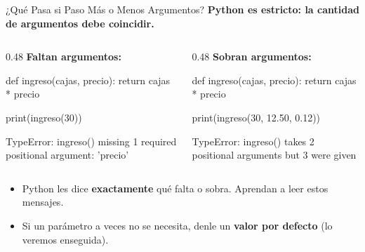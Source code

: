 \documentclass[aspectratio=169, 11pt]{beamer}
\begin{document}
\begin{frame}[fragile,shrink=28]{¿Qué Pasa si Paso Más o Menos Argumentos?}
  \vspace{-6pt}
  {\footnotesize\color{arcaDark}\bfseries
    Python es estricto: la cantidad de argumentos debe coincidir.}

  \vspace{4pt}
  \begin{columns}[T]
    \begin{column}{0.48\textwidth}
      {\scriptsize\color{arcaRed}\bfseries\faTimesCircle\hspace{4pt}
        Faltan argumentos:}
      \begin{pyblock}
def ingreso(cajas, precio):
    return cajas * precio

print(ingreso(30))
      \end{pyblock}
      \vspace{-2pt}
      \begin{outputblock}
TypeError: ingreso() missing 1 required
  positional argument: 'precio'
      \end{outputblock}
    \end{column}

    \begin{column}{0.48\textwidth}
      {\scriptsize\color{arcaRed}\bfseries\faTimesCircle\hspace{4pt}
        Sobran argumentos:}
      \begin{pyblock}
def ingreso(cajas, precio):
    return cajas * precio

print(ingreso(30, 12.50, 0.12))
      \end{pyblock}
      \vspace{-2pt}
      \begin{outputblock}
TypeError: ingreso() takes 2 positional
  arguments but 3 were given
      \end{outputblock}
    \end{column}
  \end{columns}

  \vspace{4pt}
  {\scriptsize\color{textMuted}
  \begin{itemize}\setlength{\itemsep}{3pt}
    \item[{\color{arcaRed}\scriptsize\faArrowRight}]
      Python les dice \textbf{exactamente} qué falta o sobra.
      Aprendan a leer estos mensajes.
    \item[{\color{arcaRed}\scriptsize\faLightbulb}]
      Si un parámetro a veces no se necesita,
      denle un \textbf{valor por defecto} (lo veremos enseguida).
  \end{itemize}
  }
\end{frame}
\end{document}
